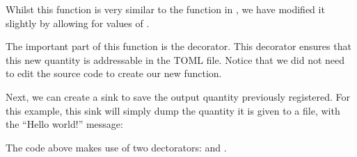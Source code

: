 \documentclass[letterpaper,10pt,english]{sphinxmanual}
\begin{document}
Whilst this function is very similar to the  function in , we have modified it slightly by allowing for values of .

The important part of this function is the  decorator. This decorator ensures that this new quantity is addressable in the TOML file. Notice that we did not need to edit the source code to create our new function.

Next, we can create a sink to save the output quantity previously registered. For this example, this sink will simply dump the quantity it is given to a file, with the “Hello world!” message:

{
\begin{sphinxVerbatim}[commandchars=\\\{\}]
\llap{\color{nbsphinxin}[2]:\,\hspace{\fboxrule}\hspace{\fboxsep}}    
    

      
       
\end{sphinxVerbatim}
}

The code above makes use of two dectorators:  and .
\end{document}
